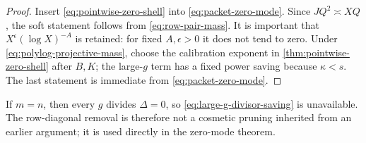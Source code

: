 \begin{proof}
Insert \eqref{eq:pointwise-zero-shell} into
\eqref{eq:packet-zero-mode}.  Since \(JQ^2\asymp XQ\), the soft
statement follows from \eqref{eq:row-pair-mass}.  It is important that
\(X^\epsilon(\log X)^{-A}\) is retained: for fixed \(A,\epsilon>0\)
it does not tend to zero.  Under
\eqref{eq:polylog-projective-mass}, choose the calibration exponent in
\cref{thm:pointwise-zero-shell} after \(B,K\); the large-\(g\) term
has a fixed power saving because \(\kappa<s\).  The last statement is
immediate from \eqref{eq:packet-zero-mode}.
\end{proof}

\begin{remark}
\label{rem:zero-diagonal}
If \(m=n\), then every \(g\) divides \(\Delta=0\), so
\eqref{eq:large-g-divisor-saving} is unavailable.  The row-diagonal
removal is therefore not a cosmetic pruning inherited from an earlier
argument; it is used directly in the zero-mode theorem.
\end{remark}
